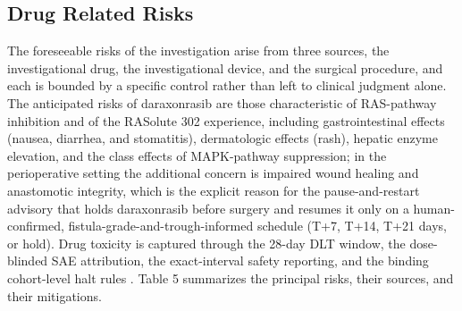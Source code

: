 \subsection{Drug Related Risks}

The foreseeable risks of the investigation arise from three sources, the
investigational drug, the investigational device, and the surgical procedure, and
each is bounded by a specific control rather than left to clinical judgment alone.
The anticipated risks of daraxonrasib are those characteristic of RAS-pathway
inhibition and of the RASolute 302 experience, including gastrointestinal effects
(nausea, diarrhea, and stomatitis), dermatologic effects (rash), hepatic enzyme
elevation, and the class effects of MAPK-pathway suppression; in the perioperative
setting the additional concern is impaired wound healing and anastomotic integrity,
which is the explicit reason for the pause-and-restart advisory that holds
daraxonrasib before surgery and resumes it only on a human-confirmed,
fistula-grade-and-trough-informed schedule (T+7, T+14, T+21 days, or hold). Drug
toxicity is captured through the 28-day DLT window, the dose-blinded SAE attribution,
the exact-interval safety reporting, and the binding cohort-level halt rules
\cite{daraxwhipple,oncotrialllm}. Table 5 summarizes the principal risks, their
sources, and their mitigations.

